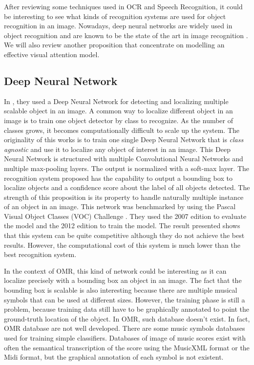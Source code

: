 \documentclass[11pt]{sdm}
\begin{document}
After reviewing some techniques used in OCR and Speech Recognition, it could be interesting to see what kinds of recognition systems are used for object recognition in an image.
Nowadays, deep neural networks are widely used in object recognition and are known to be the state of the art in image recognition \cite{erhan_scalable_2014}.
We will also review another proposition \cite{ba_multiple_2014} that concentrate on modelling an effective visual attention model.

\subsection{Deep Neural Network}

In \cite{erhan_scalable_2014}, they used a Deep Neural Network for detecting and localizing multiple scalable object in an image.
A common way to localize different object in an image is to train one object detector by class to recognize.
As the number of classes grows, it becomes computationally difficult to scale up the system.
The originality of this works is to train one single Deep Neural Network that is \textit{class agnostic} and use it to localize any object of interest in an image.
This Deep Neural Network is structured with multiple Convolutional Neural Networks and multiple max-pooling layers.
The output is normalized with a soft-max layer.
The recognition system proposed has the capability to output a bounding box to localize objects and a confidence score about the label of all objects detected.
The strength of this proposition is its property to handle naturally multiple instance of an object in an image.
This network was benchmarked by using the Pascal Visual Object Classes (VOC) Challenge \cite{everingham_pascal_2009}.
They used the 2007 edition to evaluate the model and the 2012 edition to train the model.
The result presented shows that this system can be quite competitive although they do not achieve the best results.
However, the computational cost of this system is much lower than the best recognition system.

In the context of OMR, this kind of network could be interesting as it can localize precisely with a bounding box an object in an image.
The fact that the bounding box is scalable is also interesting because there are multiple musical symbols that can be used at different sizes.
However, the training phase is still a problem, because training data still have to be graphically annotated to point the ground-truth location of the object.
In OMR, such database doesn't exist.
In fact, OMR database are not well developed.
There are some music symbols databases used for training simple classifiers.
Databases of image of music scores exist with often the semantical transcription of the score using the MusicXML format or the Midi format, but the graphical annotation of each symbol is not existent.
\end{document}
